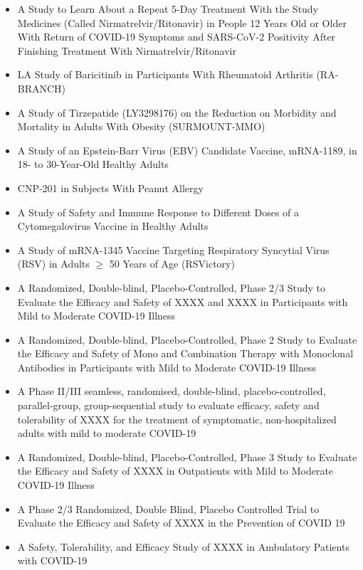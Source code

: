 \documentclass[letterpaper]{article}
\begin{document}
  \begin{itemize}

    \item A Study to Learn About a Repeat 5-Day Treatment With the Study Medicines (Called Nirmatrelvir/Ritonavir) in People 12 Years Old or Older With Return of COVID-19 Symptoms and SARS-CoV-2 Positivity After Finishing Treatment With Nirmatrelvir/Ritonavir
    \item LA Study of Baricitinib in Participants With Rheumatoid Arthritis (RA-BRANCH)
    \item A Study of Tirzepatide (LY3298176) on the Reduction on Morbidity and Mortality in Adults With Obesity (SURMOUNT-MMO)
    \item A Study of an Epstein-Barr Virus (EBV) Candidate Vaccine, mRNA-1189, in 18- to 30-Year-Old Healthy Adults
    \item CNP-201 in Subjects With Peanut Allergy
    \item A Study of Safety and Immune Response to Different Doses of a Cytomegalovirus Vaccine in Healthy Adults
    \item A Study of mRNA-1345 Vaccine Targeting Respiratory Syncytial Virus (RSV) in Adults $\geq$ 50 Years of Age (RSVictory)
    \item A Randomized, Double-blind, Placebo-Controlled, Phase 2/3 Study to Evaluate the Efficacy and Safety of XXXX and XXXX in Participants with Mild to Moderate COVID-19 Illness
    \item A Randomized, Double-blind, Placebo-Controlled, Phase 2 Study to Evaluate the Efficacy and Safety of Mono and Combination Therapy with Monoclonal Antibodies in Participants with Mild to Moderate COVID-19 Illness
    \item A Phase II/III seamless, randomised, double-blind, placebo-controlled, parallel-group, group-sequential study to evaluate efficacy, safety and tolerability of XXXX for the treatment of symptomatic, non-hospitalized adults with mild to moderate COVID-19
    \item A Randomized, Double-blind, Placebo-Controlled, Phase 3 Study to Evaluate the Efficacy and Safety of XXXX in Outpatients with Mild to Moderate COVID-19 Illness
    \item A Phase 2/3 Randomized, Double Blind, Placebo Controlled Trial to Evaluate the Efficacy and Safety of XXXX in the Prevention of COVID 19
    \item A Safety, Tolerability, and Efficacy Study of XXXX in Ambulatory Patients with COVID-19

  \end{itemize}
\end{document}
